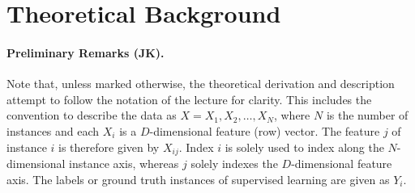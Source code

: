 \documentclass[12pt, a4paper]{scrartcl}
\begin{document}
\section{Theoretical Background}	
\label{sec:theo}

\paragraph{Preliminary Remarks (JK).} Note that, unless marked otherwise, the theoretical derivation and description attempt to follow the notation of the lecture \cite{kothe2018foml} for clarity.
This includes the convention to describe the data as $X = { X_1, X_2, \dots, X_N}$, where $N$ is the number of instances and each $X_i$ is a $D$-dimensional feature (row) vector. The feature $j$ of instance $i$ is therefore given by $X_{ij}$.  Index $i$ is solely used to index along the $N$-dimensional instance axis, whereas $j$ solely indexes the $D$-dimensional feature axis. The labels or ground truth instances of supervised learning are given as $Y_i$.
\end{document}
